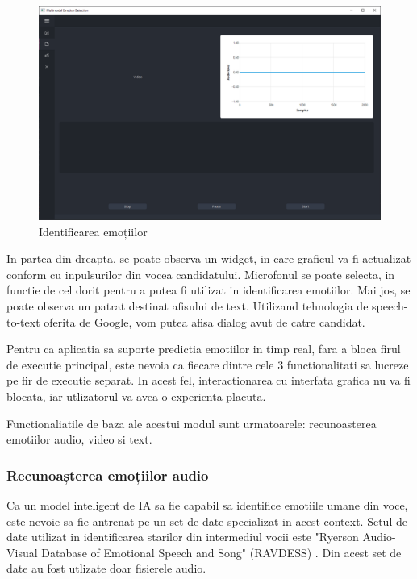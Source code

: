 \documentclass[a4paper, 12pt]{report}
\begin{document}
	\begin{figure}[H]
		\begin{center}
			\includegraphics[scale=0.4]{images/emotion_recognition_clean.png}
		\end{center}
		\caption{Identificarea emoțiilor}
		\label{fig:emotion_recog_clean}
	\end{figure} 
	
	In partea din dreapta, se poate observa un widget, in care graficul va fi actualizat conform cu inpulsurilor din vocea candidatului. Microfonul se poate selecta, in functie de cel dorit pentru a putea fi utilizat in identificarea emotiilor. Mai jos, se poate observa un patrat destinat afisului de text. Utilizand tehnologia de speech-to-text oferita de Google, vom putea afisa dialog avut de catre candidat.
	
	Pentru ca aplicatia sa suporte predictia emotiilor in timp real, fara a bloca firul de executie principal, este nevoia ca fiecare dintre cele 3 functionalitati sa lucreze pe fir de executie separat. In acest fel, interactionarea cu interfata grafica nu va fi blocata, iar utlizatorul va avea o experienta placuta.
	
	Functionaliatile de baza ale acestui modul sunt urmatoarele: recunoasterea emotiilor audio, video si text.	
	
	\subsubsection{Recunoașterea emoțiilor audio}
	Ca un model inteligent de IA sa fie capabil sa identifice emotiile umane din voce, este nevoie sa fie antrenat pe un set de date specializat in acest context. Setul de date utilizat in identificarea starilor din intermediul vocii este "Ryerson Audio-Visual Database of Emotional Speech and Song" (RAVDESS) \cite{ravdess}. Din acest set de date au fost utlizate doar fisierele audio.
	
\end{document}
